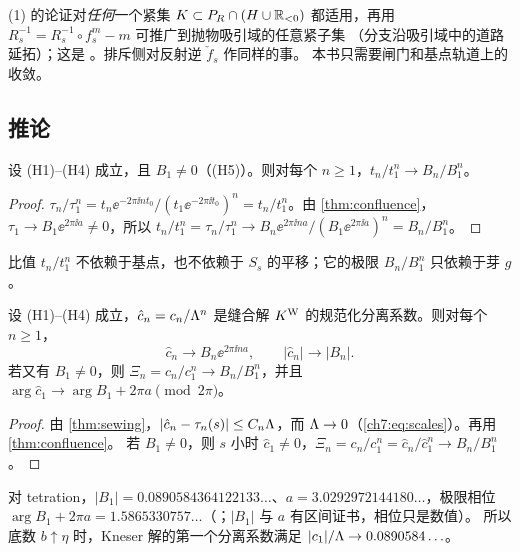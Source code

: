 \begin{remark}\label{ch7:rem:basin}
(1) 的论证对\emph{任何}一个紧集 $K\subset P_R\cap(H\cup\mathbb{R}_{<0})$ 都适用，再用 $R_s^{-1}=R_s^{-1}\circ f_s^m-m$ 可推广到抛物吸引域的任意紧子集
（分支沿吸引域中的道路延拓）；这是 \cite[定理~4.4(1)]{KneserPaper}。排斥侧对反射逆 $\check f_s$ 作同样的事。
本书只需要闸门和基点轨道上的收敛。
\end{remark}

\subsection{推论}

\begin{corollary}[规范无关的比值]\label{ch7:cor:ratios}
设 (H1)--(H4) 成立，且 $B_1\ne0$（(H5)）。则对每个 $n\ge1$，$t_n/t_1^n\to B_n/B_1^n$。
\end{corollary}

\begin{proof}
$\tau_n/\tau_1^n=t_n\ee^{-2\pi\ii nt_0}/(t_1\ee^{-2\pi\ii t_0})^n=t_n/t_1^n$。由 \cref{thm:confluence}，
$\tau_1\to B_1\ee^{2\pi\ii a}\ne0$，所以 $t_n/t_1^n=\tau_n/\tau_1^n\to B_n\ee^{2\pi\ii na}/(B_1\ee^{2\pi\ii a})^n=B_n/B_1^n$。
\end{proof}

比值 $t_n/t_1^n$ 不依赖于基点，也不依赖于 $S_s$ 的平移；它的极限 $B_n/B_1^n$ 只依赖于芽 $g$。

\begin{corollary}[缝合解的分离系数]\label{ch7:cor:sewing}
设 (H1)--(H4) 成立，$\hat c_n=c_n/\Lambda^n$ 是缝合解 $K^{\mathrm W}$ 的规范化分离系数。则对每个 $n\ge1$，
\[
 \hat c_n\longrightarrow B_n\ee^{2\pi\ii na},\qquad |\hat c_n|\to|B_n| .
\]
若又有 $B_1\ne0$，则 $\Xi_n=c_n/c_1^n\to B_n/B_1^n$，并且 $\arg\hat c_1\to\arg B_1+2\pi a\pmod{2\pi}$。
\end{corollary}

\begin{proof}
由 \cref{thm:sewing}，$|\hat c_n-\tau_n(s)|\le C_n\Lambda$，而 $\Lambda\to0$（\eqref{ch7:eq:scales}）。再用 \cref{thm:confluence}。
若 $B_1\ne0$，则 $s$ 小时 $\hat c_1\ne0$，$\Xi_n=c_n/c_1^n=\hat c_n/\hat c_1^n\to B_n/B_1^n$。
\end{proof}

对 tetration，$|B_1|=0.0890584364122133\ldots$、$a=3.0292972144180\ldots$，极限相位
$\arg B_1+2\pi a=1.5865330757\ldots$（\cite{KneserPaper}；$|B_1|$ 与 $a$ 有区间证书，相位只是数值）。
所以底数 $b\uparrow\eta$ 时，Kneser 解的第一个分离系数满足 $|c_1|/\Lambda\to0.0890584\ldots$。

